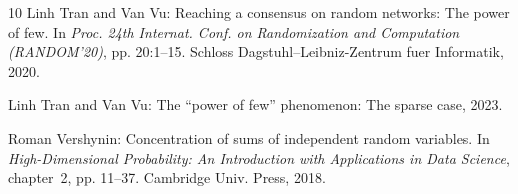 \documentclass[11pt]{article}
\numberwithin{equation}{section}
\theoremstyle{definition}
\theoremstyle{plain}
\begin{document}
\begin{thebibliography}{10}
{\sc Linh Tran and Van Vu}: Reaching a consensus on random networks: {T}he
  power of few.
\newblock In {\em Proc. 24th Internat. Conf. on Randomization and Computation
  (RANDOM'20)}, pp. 20:1--15. Schloss Dagstuhl--Leibniz-Zentrum fuer
  Informatik, 2020.

{\sc Linh Tran and Van Vu}: The ``power of few'' phenomenon: {T}he sparse case,
  2023.

{\sc Roman Vershynin}: Concentration of sums of independent random variables.
\newblock In {\em High-Dimensional Probability: An Introduction with
  Applications in Data Science}, chapter~2, pp. 11--37. Cambridge Univ. Press,
  2018.
\newblock [\epfmtdoi{10.1017/9781108231596.005}]

\end{thebibliography}
\end{document}
